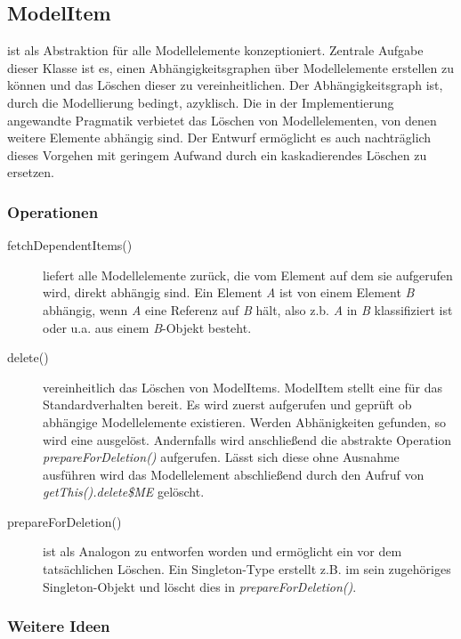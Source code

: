 \subsection{ModelItem}

 ist als Abstraktion für alle Modellelemente konzeptioniert. 
Zentrale Aufgabe dieser Klasse ist es, einen Abhängigkeitsgraphen über Modellelemente erstellen zu können und 
das Löschen dieser zu vereinheitlichen. Der Abhängigkeitsgraph ist, durch die Modellierung bedingt, azyklisch.
Die in der Implementierung angewandte Pragmatik verbietet das Löschen von Modellelementen, von denen weitere Elemente 
abhängig sind. Der Entwurf ermöglicht es auch nachträglich dieses Vorgehen mit geringem Aufwand durch ein kaskadierendes Löschen zu 
ersetzen. 



\subsubsection{Operationen}
\begin{description}
\item[fetchDependentItems()] 
liefert alle Modellelemente zurück, die vom Element auf dem sie aufgerufen wird, direkt abhängig sind.
Ein Element \emph{A} ist von einem Element \emph{B} abhängig, wenn \emph{A} eine Referenz auf \emph{B} hält, also z.b.   
\emph{A} in \emph{B} klassifiziert ist oder u.a. aus einem \emph{B}-Objekt besteht.
 
\item[delete()] vereinheitlich das Löschen von ModelItems. ModelItem stellt eine  für das 
Standardverhalten bereit. Es wird zuerst  aufgerufen und geprüft ob abhängige Modellelemente 
existieren. Werden Abhänigkeiten gefunden, so wird eine  ausgelöst. Andernfalls wird anschließend 
die abstrakte Operation \emph{prepareForDeletion()} aufgerufen. Lässt sich diese ohne Ausnahme ausführen wird das Modellelement 
abschließend durch den Aufruf von \emph{getThis().delete\$ME} gelöscht.

\item[prepareForDeletion()] ist als Analogon zu  entworfen worden und ermöglicht ein 
 vor dem tatsächlichen Löschen. Ein Singleton-Type erstellt z.B. im  sein zugehöriges 
Singleton-Objekt und löscht dies in \emph{prepareForDeletion()}. 

\end{description}
\subsubsection{Weitere Ideen}

